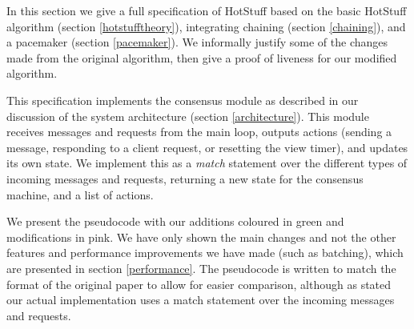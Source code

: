 
In this section we give a full specification of HotStuff based on the basic HotStuff algorithm (section \ref{hotstufftheory}), integrating chaining (section \ref{chaining}), and a pacemaker (section \ref{pacemaker}). We informally justify some of the changes made from the original algorithm, then give a proof of liveness for our modified algorithm.

This specification implements the consensus module as described in our discussion of the system architecture (section \ref{architecture}). This module receives messages and requests from the main loop, outputs actions (sending a message, responding to a client request, or resetting the view timer), and updates its own state. We implement this as a \textit{match} statement over the different types of incoming messages and requests, returning a new state for the consensus machine, and a list of actions.

We present the pseudocode with our additions coloured in green and modifications in pink. We have only shown the main changes and not the other features and performance improvements we have made (such as batching), which are presented in section \ref{performance}. The pseudocode is written to match the format of the original paper to allow for easier comparison, although as stated our actual implementation uses a match statement over the incoming messages and requests.

